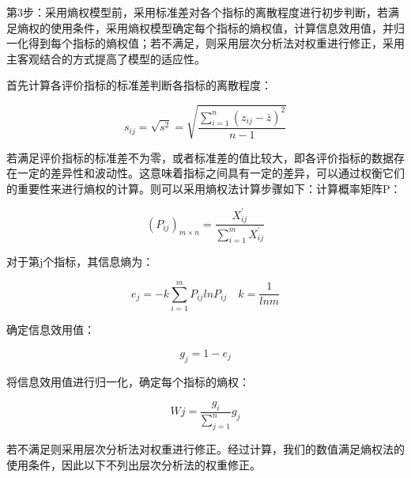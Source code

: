 \documentclass[withoutpreface,bwprint]{cumcmthesis} %
\begin{document}
第3步：采用熵权模型前，采用标准差对各个指标的离散程度进行初步判断，若满足熵权的使用条件，采用熵权模型确定每个指标的熵权值，计算信息效用值，并归一化得到每个指标的熵权值；若不满足，则采用层次分析法对权重进行修正，采用主客观结合的方式提高了模型的适应性。

首先计算各评价指标的标准差判断各指标的离散程度：





\begin{equation}
	s_{ij} = \sqrt{ s^2 } = \sqrt{ \frac{\sum_{i=1}^{n}(z_{ij}-\bar{z})^2}{n-1}}
	\label{eq:013}
\end{equation}


若满足评价指标的标准差不为零，或者标准差的值比较大，即各评价指标的数据存在一定的差异性和波动性。这意味着指标之间具有一定的差异，可以通过权衡它们的重要性来进行熵权的计算。则可以采用熵权法计算步骤如下：计算概率矩阵P：






\begin{equation}
	\left ( P_{ij} \right )_{m\times n}=\frac{X_{ij}^{'}}{\sum_{i=1}^{m}X_{ij}^{'}}
	\label{eq:013}
\end{equation}



对于第j个指标，其信息熵为：





\begin{equation}
	e_{j}=-k\sum_{i=1}^{m}P_{ij}lnP_{ij}   \quad    k=\frac{1}{lnm}
	\label{eq:013}
\end{equation}



确定信息效用值：







\begin{equation}
g_{j}=1-e_{j}
	\label{eq:013}
\end{equation}



将信息效用值进行归一化，确定每个指标的熵权：





\begin{equation}
	W{j}=\frac{g_{i}}{\sum_{j=1}^{n}}g_{j}
	\label{eq:013}
\end{equation}


若不满足则采用层次分析法对权重进行修正。经过计算，我们的数值满足熵权法的使用条件，因此以下不列出层次分析法的权重修正。
\end{document}
